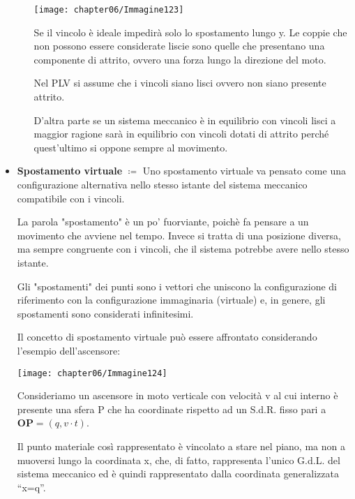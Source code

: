 \begin{itemize}
\begin{itemize}
			\begin{minipage}{.4\textwidth}
			\centering
			\texttt{[image: chapter06/Immagine123]}
			\end{minipage}
			\hfill
			\begin{minipage}{.5\textwidth}
			 Se il vincolo è ideale impedirà solo lo spostamento lungo y.			 
			 Le coppie che non possono essere considerate liscie sono quelle che presentano una componente di attrito, ovvero una forza lungo la direzione del moto.
			 
			 Nel PLV si assume che i vincoli siano lisci ovvero non siano presente attrito.
			 
			  D'altra parte se un sistema meccanico è in equilibrio con vincoli lisci a maggior ragione sarà in equilibrio con vincoli dotati di attrito perché quest'ultimo si oppone sempre al movimento.
			\end{minipage}
		\end{itemize}
		
		\item \textbf{Spostamento virtuale} $\coloneqq$ Uno spostamento virtuale va pensato come una configurazione alternativa nello stesso istante del sistema meccanico compatibile con i vincoli. 

La parola "spostamento" è un po' fuorviante, poichè fa pensare a un movimento che avviene nel tempo. Invece si tratta di una posizione diversa, ma sempre congruente con i vincoli, che il sistema potrebbe avere nello stesso istante. 

Gli "spostamenti" dei punti sono i vettori che uniscono la configurazione di riferimento con la configurazione immaginaria (virtuale) e, in genere, gli spostamenti sono considerati infinitesimi.

Il concetto di spostamento virtuale può essere affrontato considerando l'esempio dell'ascensore:

\begin{minipage}{.4\textwidth}
\centering
\texttt{[image: chapter06/Immagine124]}
\end{minipage}
\hfill
\begin{minipage}{.5\textwidth}
	Consideriamo un ascensore in moto verticale con velocità v al cui interno è presente una sfera P che ha coordinate rispetto ad un S.d.R. fisso pari a $\mathbf{OP} = (q,v\cdot t)$.\newline
	
	Il punto materiale così rappresentato è vincolato a stare nel piano, ma non a muoversi lungo la coordinata x, che, di fatto, rappresenta l'unico G.d.L. del sistema meccanico ed è quindi rappresentato dalla coordinata generalizzata ``x=q''.
\end{minipage}


\end{itemize}

